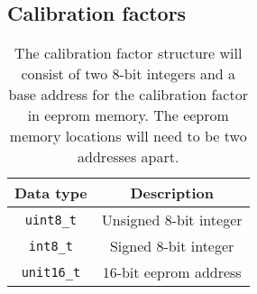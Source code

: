 \clearpage{}
\subsection{Calibration factors}

\begin{table}[ht]
  \begin{center}
    \begin{tabular}{|c|c|}
      \hline
      Data type &Description\\
      \hline\hline
      \texttt{uint8\_t} &Unsigned 8-bit integer\\
      \hline
      \texttt{int8\_t}   &Signed 8-bit integer\\
      \hline
      \texttt{unit16\_t} &16-bit eeprom address\\
      \hline
      \end{tabular}
      \caption{The calibration factor structure will consist of two
        8-bit integers and a base address for the calibration factor
        in eeprom memory.  The eeprom memory locations will need to be
        two addresses apart.}
  \end{center}
\end{table}


